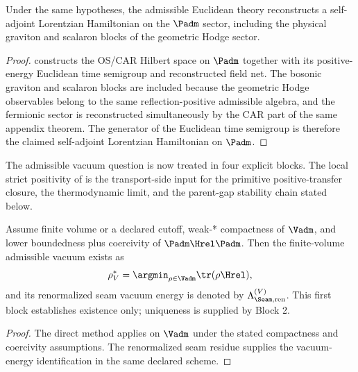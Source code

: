 \begin{theorem}
\label{thm:lorentzian-reconstruction}
Under the same hypotheses, the admissible Euclidean theory reconstructs a self-adjoint Lorentzian Hamiltonian on the $\Padm$ sector, including the physical graviton and scalaron blocks of the geometric Hodge sector.
\end{theorem}

\begin{proof}
 constructs the OS/CAR Hilbert space on $\Padm$ together
with its positive-energy Euclidean time semigroup and reconstructed field net. The bosonic graviton
and scalaron blocks are included because the geometric Hodge observables belong to the same
reflection-positive admissible algebra, and the fermionic sector is reconstructed simultaneously by
the CAR part of the same appendix theorem. The generator of the Euclidean time semigroup is
therefore the claimed self-adjoint Lorentzian Hamiltonian on $\Padm$.
\end{proof}

The admissible vacuum question is now treated in four explicit blocks. The local strict positivity
of  is the transport-side input
for the primitive positive-transfer closure, the thermodynamic limit, and the parent-gap
stability chain stated below.

\begin{theorem}
\label{thm:admissible-vacuum-existence}
\label{thm:admissible-vacuum-finite-volume}
Assume finite volume or a declared cutoff, weak-* compactness of $\Vadm$, and lower
boundedness plus coercivity of $\Padm\Hrel\Padm$. Then the finite-volume admissible vacuum
exists as
\[
\rho^\ast_V=\argmin_{\rho\in\Vadm}\tr(\rho\Hrel),
\]
and its renormalized seam vacuum energy is denoted by $\Lambda_{\Seam,\mathrm{ren}}^{(V)}$. This
first block establishes existence only; uniqueness is supplied by Block 2.
\end{theorem}

\begin{proof}
The direct method applies on $\Vadm$ under the stated compactness and coercivity assumptions.
The renormalized seam residue supplies the vacuum-energy identification in the same declared
scheme.
\end{proof}

